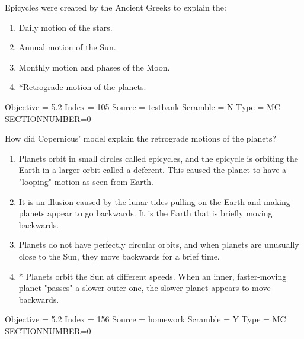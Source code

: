 \documentclass[11pt]{article}
\begin{document}
\begin{enumerate}
\begin{minipage}{\textwidth}
\begin{minipage}{\textwidth}
\item Epicycles were created by the Ancient Greeks to explain the:
\begin{multicols}{2}
\begin{enumerate} 
\setlength{\itemsep}{1pt} 
\setlength{\parskip}{0pt} 
\setlength{\parsep}{0pt}
\setlength{\multicolsep}{1pt} 
\item Daily motion of the stars.
\item Annual motion of the Sun.
\item Monthly motion and phases of the Moon.
\item *Retrograde motion of the planets.
\end{enumerate} 
\vfill 
\end{multicols}

Objective = 5.2
Index = 105
Source = testbank
Scramble = N
Type = MC
SECTIONNUMBER=0
\end{minipage}
\end{minipage}
\vskip 0.20in

\begin{minipage}{\textwidth}
\begin{minipage}{\textwidth}
\item How did Copernicus' model explain the retrograde motions of the planets?
\begin{enumerate} 
\setlength{\itemsep}{1pt} 
\setlength{\parskip}{0pt} 
\setlength{\parsep}{0pt}
\setlength{\multicolsep}{1pt} 
\item  Planets orbit in small circles called epicycles, and the epicycle is orbiting the Earth in a larger orbit called a deferent. This caused the planet to have a "looping" motion as seen from Earth.
\item  It is an illusion caused by the lunar tides pulling on the Earth and making planets appear to go backwards. It is the Earth that is briefly moving backwards.
\item  Planets do not have perfectly circular orbits, and when planets are unusually close to the Sun, they move backwards for a brief time.
\item * Planets orbit the Sun at different speeds. When an inner, faster-moving planet "passes" a slower outer one, the slower planet appears to move backwards.
\end{enumerate} 
Objective = 5.2
Index = 156
Source = homework
Scramble = Y
Type = MC
SECTIONNUMBER=0
\end{minipage}
\end{minipage}
\vskip 0.20in


\end{enumerate}
\end{document}
